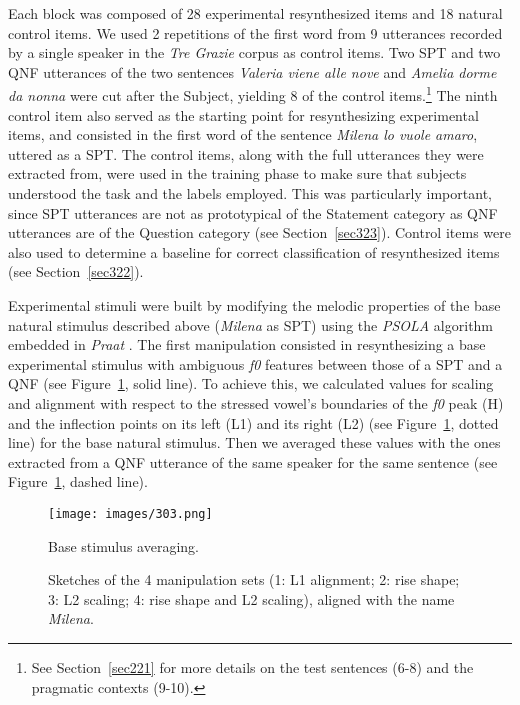 Each block was composed of 28 experimental resynthesized items and 18 natural control items. We used 2 repetitions of the first word from 9 utterances recorded by a single speaker in the \textit{Tre Grazie} corpus as control items. Two SPT and two QNF utterances of the two sentences \textit{Valeria viene alle nove} and \textit{Amelia dorme da nonna} were cut after the Subject, yielding 8 of the control items.\footnote{See Section~\ref{sec221} for more details on the test sentences (6-8) and the pragmatic contexts (9-10).} The ninth control item also served as the starting point for resynthesizing experimental items, and consisted in the first word of the sentence \textit{Milena lo vuole amaro}, uttered as a SPT. The control items, along with the full utterances they were extracted from, were used in the training phase to make sure that subjects understood the task and the labels employed. This was particularly important, since SPT utterances are not as prototypical of the Statement category as QNF utterances are of the Question category (see Section~\ref{sec323}). Control items were also used to determine a baseline for correct classification of resynthesized items (see Section~\ref{sec322}). 

Experimental stimuli were built by modifying the melodic properties of the base natural stimulus described above (\textit{Milena} as SPT) using the \textit{PSOLA} algorithm \citep{moulines1990pitchsyncronous} embedded in \textit{Praat} \citep{boersma2008praat}. The first manipulation consisted in resynthesizing a base experimental stimulus with ambiguous \textit{f0} features between those of a SPT and a QNF (see Figure~\ref{fig303}, solid line). To achieve this, we calculated values for scaling and alignment with respect to the stressed vowel’s boundaries of the \textit{f0} peak (H) and the inflection points on its left (L1) and its right (L2) (see Figure~\ref{fig303}, dotted line) for the base natural stimulus. Then we averaged these values with the ones extracted from a QNF utterance of the same speaker for the same sentence (see Figure~\ref{fig303}, dashed line). 

\begin{figure}[p]
\centering
\texttt{[image: images/303.png]}
\caption{Base stimulus averaging.}
\label{fig303}\end{figure}


\begin{figure}[p]
\centering
{}
\caption{Sketches of the 4 manipulation sets (1: L1 alignment; 2: rise shape; 3: L2 scaling; 4: rise shape and L2 scaling), aligned with the name \textit{Milena}.}
\label{fig304}\end{figure}


